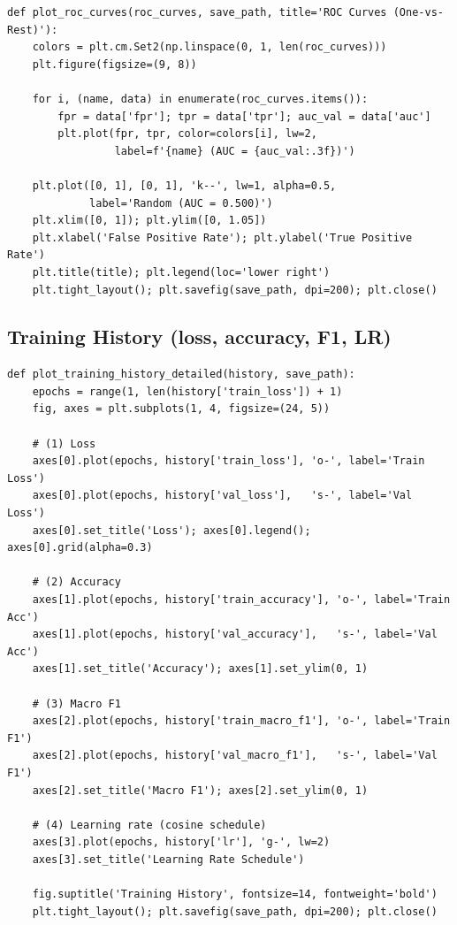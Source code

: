 \documentclass[11pt,a4paper]{article}
\begin{document}
\begin{lstlisting}[caption={Vẽ ROC curves --- 1 đường cong cho mỗi lớp}]
def plot_roc_curves(roc_curves, save_path, title='ROC Curves (One-vs-Rest)'):
    colors = plt.cm.Set2(np.linspace(0, 1, len(roc_curves)))
    plt.figure(figsize=(9, 8))

    for i, (name, data) in enumerate(roc_curves.items()):
        fpr = data['fpr']; tpr = data['tpr']; auc_val = data['auc']
        plt.plot(fpr, tpr, color=colors[i], lw=2,
                 label=f'{name} (AUC = {auc_val:.3f})')

    plt.plot([0, 1], [0, 1], 'k--', lw=1, alpha=0.5,
             label='Random (AUC = 0.500)')
    plt.xlim([0, 1]); plt.ylim([0, 1.05])
    plt.xlabel('False Positive Rate'); plt.ylabel('True Positive Rate')
    plt.title(title); plt.legend(loc='lower right')
    plt.tight_layout(); plt.savefig(save_path, dpi=200); plt.close()
\end{lstlisting}

\subsection{Training History (loss, accuracy, F1, LR)}

\begin{lstlisting}[caption={Plot training history với 4 subplot}]
def plot_training_history_detailed(history, save_path):
    epochs = range(1, len(history['train_loss']) + 1)
    fig, axes = plt.subplots(1, 4, figsize=(24, 5))

    # (1) Loss
    axes[0].plot(epochs, history['train_loss'], 'o-', label='Train Loss')
    axes[0].plot(epochs, history['val_loss'],   's-', label='Val Loss')
    axes[0].set_title('Loss'); axes[0].legend(); axes[0].grid(alpha=0.3)

    # (2) Accuracy
    axes[1].plot(epochs, history['train_accuracy'], 'o-', label='Train Acc')
    axes[1].plot(epochs, history['val_accuracy'],   's-', label='Val Acc')
    axes[1].set_title('Accuracy'); axes[1].set_ylim(0, 1)

    # (3) Macro F1
    axes[2].plot(epochs, history['train_macro_f1'], 'o-', label='Train F1')
    axes[2].plot(epochs, history['val_macro_f1'],   's-', label='Val F1')
    axes[2].set_title('Macro F1'); axes[2].set_ylim(0, 1)

    # (4) Learning rate (cosine schedule)
    axes[3].plot(epochs, history['lr'], 'g-', lw=2)
    axes[3].set_title('Learning Rate Schedule')

    fig.suptitle('Training History', fontsize=14, fontweight='bold')
    plt.tight_layout(); plt.savefig(save_path, dpi=200); plt.close()
\end{lstlisting}
\end{document}
